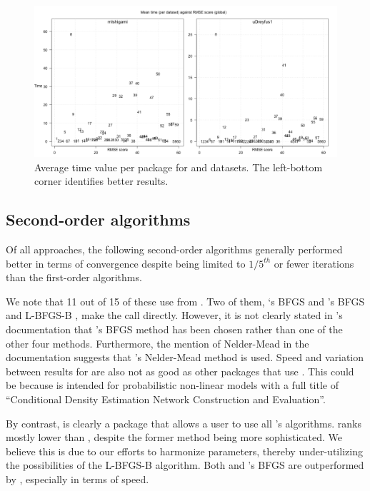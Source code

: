 \begin{figure}
  \centering
  \includegraphics[width=\textwidth]{mIshigami-uDreyfus1-timmean.png}
        \caption{Average time value per package for 
        and  datasets. 
        The left-bottom corner identifies better results.}
        \label{fig:Allpkg:timemean}
\end{figure}

\hypertarget{second-order-algorithms}{%
\subsection{Second-order algorithms}\label{second-order-algorithms}}

Of all approaches, the following second-order algorithms generally
performed better in terms of convergence despite being limited to
\(1/5^{th}\) or fewer iterations than the first-order algorithms.

We note that 11 out of 15 of these  use
 from . Two of them, `s BFGS
\citep{R-CaDENCE} and 's BFGS and L-BFGS-B
\citep{R-validann}, make the call directly. However, it is not clearly
stated in 's documentation that 's BFGS method
has been chosen rather than one of the other four methods. Furthermore,
the mention of Nelder-Mead in the documentation suggests that
's Nelder-Mead method is used. Speed and variation between
results for  are also not as good as other packages that
use . This could be because  is intended for
probabilistic non-linear models with a full title of ``Conditional
Density Estimation Network Construction and Evaluation''.

By contrast,  is clearly a package that allows a user to
use all 's algorithms.  ranks
mostly lower than , despite the former method
being more sophisticated. We believe this is due to our efforts to
harmonize parameters, thereby under-utilizing the possibilities of the
L-BFGS-B algorithm. Both  and 's BFGS are
outperformed by , especially in terms of speed.

